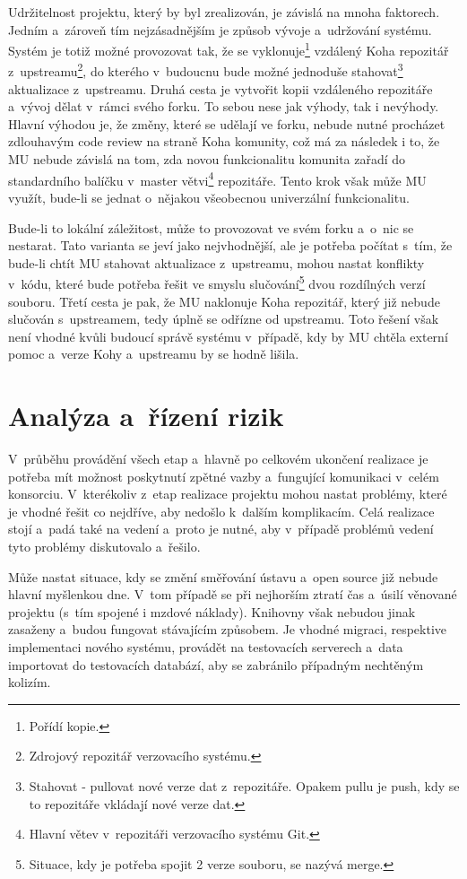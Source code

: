 \documentclass[
	11pt, oneside, printed, final, palatino, monochrome
	microtype,
	table,   %
	lof,     %
	lot     %
]{fithesis3}
\begin{document}
{Udržitelnost projektu, který by byl zrealizován, je závislá na mnoha faktorech. Jedním a~zároveň tím nejzásadnějším je způsob vývoje a~udržování systému. Systém je totiž možné provozovat tak, že se vyklonuje\footnote{Pořídí kopie.} vzdálený Koha repozitář z~upstreamu\footnote{Zdrojový repozitář verzovacího systému.}, do kterého v~budoucnu bude možné jednoduše stahovat\footnote{Stahovat - pullovat nové verze dat z~repozitáře. Opakem pullu je push, kdy se to repozitáře vkládají nové verze dat.} aktualizace z~upstreamu. Druhá cesta je vytvořit kopii vzdáleného repozitáře a~vývoj dělat v~rámci svého forku. To sebou nese jak výhody, tak i nevýhody. Hlavní výhodou je, že změny, které se udělají ve forku, nebude nutné procházet zdlouhavým code review na straně Koha komunity, což má za následek i to, že MU nebude závislá na tom, zda novou funkcionalitu komunita zařadí do standardního balíčku v~master větvi\footnote{Hlavní větev v~repozitáři verzovacího systému Git.} repozitáře. Tento krok však může MU využít, bude-li se jednat o~nějakou všeobecnou univerzální funkcionalitu. 

Bude-li to lokální záležitost, může to provozovat ve svém forku a~o~nic se nestarat. Tato varianta se jeví jako nejvhodnější, ale je potřeba počítat s~tím, že bude-li chtít MU stahovat aktualizace z~upstreamu, mohou nastat konflikty v~kódu, které bude potřeba řešit ve smyslu slučování\footnote{Situace, kdy je potřeba spojit 2 verze souboru, se nazývá merge.} dvou rozdílných verzí souboru. Třetí cesta je pak, že MU naklonuje Koha repozitář, který již nebude slučován s~upstreamem, tedy úplně se odřízne od upstreamu. Toto řešení však není vhodné kvůli budoucí správě systému v~případě, kdy by MU chtěla externí pomoc a~verze Kohy a~upstreamu by se hodně lišila. 

\section{Analýza a~řízení rizik}
V~průběhu provádění všech etap a~hlavně po celkovém ukončení realizace je potřeba mít možnost poskytnutí zpětné vazby a~fungující komunikaci v~celém konsorciu. V~kterékoliv z~etap realizace projektu mohou nastat problémy, které je vhodné řešit co nejdříve, aby nedošlo k~dalším komplikacím. Celá realizace stojí a~padá také na vedení a~proto je nutné, aby v~případě problémů vedení tyto problémy diskutovalo a~řešilo. 

Může nastat situace, kdy se změní směřování ústavu a~open source již nebude hlavní myšlenkou dne. V~tom případě se při nejhorším ztratí čas a~úsilí věnované projektu (s~tím spojené i mzdové náklady). Knihovny však nebudou jinak zasaženy a~budou fungovat stávajícím způsobem. Je vhodné migraci, respektive implementaci nového systému, provádět na testovacích serverech a~data importovat do testovacích databází, aby se zabránilo případným nechtěným kolizím.

}
\end{document}
